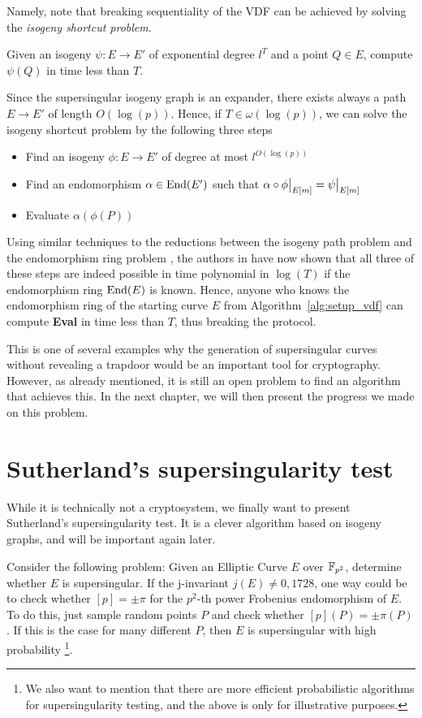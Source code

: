 Namely, note that breaking sequentiality of the VDF can be achieved by solving the \emph{isogeny shortcut problem}.
\begin{problem}
    Given an isogeny $\psi: E \to E'$ of exponential degree $l^T$ and a point $Q \in E$, compute $\psi(Q)$ in time less than $T$.
\end{problem}
Since the supersingular isogeny graph is an expander, there exists always a path $E \to E'$ of length $O(\log(p))$.
Hence, if $T \in \omega(\log(p))$, we can solve the isogeny shortcut problem by the following three steps
\begin{itemize}
    \item Find an isogeny $\phi: E \to E'$ of degree at most $l^{O(\log(p))}$
    \item Find an endomorphism $\alpha \in \mathrm{End}(E')$ such that $\restr{\alpha \circ \phi}{E[m]} = \restr{\psi}{E[m]}$
    \item Evaluate $\alpha(\phi(P))$
\end{itemize}
Using similar techniques to the reductions between the isogeny path problem and the endomorphism ring problem \cite{endomorphism_ring_isogeny_path_equivalent}, the authors in \cite{verifiable_delay_function} have now shown that all three of these steps are indeed possible in time polynomial in $\log(T)$ if the endomorphism ring $\mathrm{End}(E)$ is known.
Hence, anyone who knows the endomorphism ring of the starting curve $E$ from Algorithm~\ref{alg:setup_vdf} can compute \textbf{Eval} in time less than $T$, thus breaking the protocol.

This is one of several examples why the generation of supersingular curves without revealing a trapdoor would be an important tool for cryptography.
However, as already mentioned, it is still an open problem to find an algorithm that achieves this.
In the next chapter, we will then present the progress we made on this problem. 

\section{Sutherland's supersingularity test}
\label{sec:sutherlands_supersingularity_test}
While it is technically not a cryptosystem, we finally want to present Sutherland's supersingularity test.
It is a clever algorithm based on isogeny graphs, and will be important again later.

Consider the following problem: Given an Elliptic Curve $E$ over $\mathbb{F}_{p^2}$, determine whether $E$ is supersingular.
If the j-invariant $j(E) \neq 0, 1728$, one way could be to check whether $[p] = \pm \pi$ for the $p^2$-th power Frobenius endomorphism of $E$.
To do this, just sample random points $P$ and check whether $[p](P) = \pm \pi(P)$.
If this is the case for many different $P$, then $E$ is supersingular with high probability
\footnote{We also want to mention that there are more efficient probabilistic algorithms for supersingularity testing, and the above is only for illustrative purposes.}.

